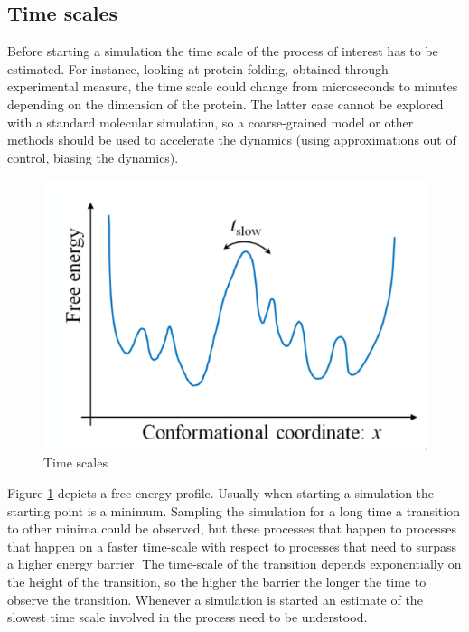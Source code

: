 	\subsection{Time scales}
	Before starting a simulation the time scale of the process of interest has to be estimated.
	For instance, looking at protein folding, obtained through experimental measure, the time scale could change from microseconds to minutes depending on the dimension of the protein.
	The latter case cannot be explored with a standard molecular simulation, so a coarse-grained model or other methods should be used to accelerate the dynamics (using approximations out of control, biasing the dynamics).

	\begin{figure}[H]
		\centering
		\includegraphics[scale = 0.4]{time-scales}
		\caption{Time scales}
		\label{fig:time-scales}
	\end{figure}

	Figure \ref{fig:time-scales} depicts a free energy profile.
	Usually when starting a simulation the starting point is a minimum.
	Sampling the simulation for a long time a transition to other minima could be observed, but these processes that happen to processes that happen on a faster time-scale with respect to processes that need to surpass a higher energy barrier.
	The time-scale of the transition depends exponentially on the height of the transition, so the higher the barrier the longer the time to observe the transition.
	Whenever a simulation is started an estimate of the slowest time scale involved in the process need to be understood.



